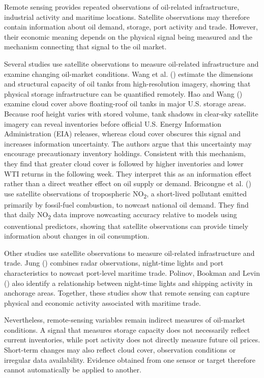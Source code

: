 \documentclass[
  british,
  12pt,
  oneside]{book}
\begin{document}
Remote sensing provides repeated observations of oil-related infrastructure, industrial activity and maritime locations. Satellite observations may therefore contain information about oil demand, storage, port activity and trade. However, their economic meaning depends on the physical signal being measured and the mechanism connecting that signal to the oil market.

Several studies use satellite observations to measure oil-related infrastructure and examine changing oil-market conditions. Wang et al. () estimate the dimensions and structural capacity of oil tanks from high-resolution imagery, showing that physical storage infrastructure can be quantified remotely. Hao and Wang () examine cloud cover above floating-roof oil tanks in major U.S. storage areas. Because roof height varies with stored volume, tank shadows in clear-sky satellite imagery can reveal inventories before official U.S. Energy Information Administration (EIA) releases, whereas cloud cover obscures this signal and increases information uncertainty. The authors argue that this uncertainty may encourage precautionary inventory holdings. Consistent with this mechanism, they find that greater cloud cover is followed by higher inventories and lower WTI returns in the following week. They interpret this as an information effect rather than a direct weather effect on oil supply or demand. Bricongne et al. () use satellite observations of tropospheric NO\textsubscript{2}, a short-lived pollutant emitted primarily by fossil-fuel combustion, to nowcast national oil demand. They find that daily NO\textsubscript{2} data improve nowcasting accuracy relative to models using conventional predictors, showing that satellite observations can provide timely information about changes in oil consumption.

Other studies use satellite observations to measure oil-related infrastructure and trade. Jung () combines radar observations, night-time lights and port characteristics to nowcast port-level maritime trade. Polinov, Bookman and Levin () also identify a relationship between night-time lights and shipping activity in anchorage areas. Together, these studies show that remote sensing can capture physical and economic activity associated with maritime trade.

Nevertheless, remote-sensing variables remain indirect measures of oil-market conditions. A signal that measures storage capacity does not necessarily reflect current inventories, while port activity does not directly measure future oil prices. Short-term changes may also reflect cloud cover, observation conditions or irregular data availability. Evidence obtained from one sensor or target therefore cannot automatically be applied to another.
\end{document}
